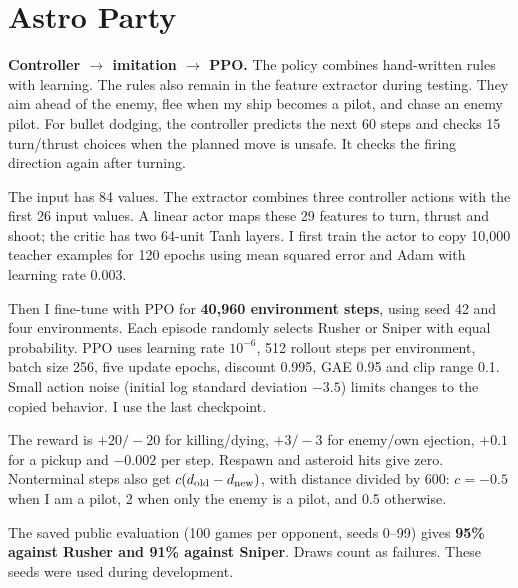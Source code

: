 \documentclass[a4paper]{article}
\begin{document}
\section{Astro Party}
\begin{answer}
\textbf{Controller $\rightarrow$ imitation $\rightarrow$ PPO.}
The policy combines hand-written rules with learning. The rules also remain in the feature extractor during testing.
They aim ahead of the enemy, flee when my ship becomes a pilot, and chase an enemy pilot.
For bullet dodging, the controller predicts the next 60 steps and checks 15 turn/thrust choices when the planned move is unsafe. It checks the firing direction again after turning.

The input has 84 values. The extractor combines three controller actions with the first 26 input values.
A linear actor maps these 29 features to turn, thrust and shoot; the critic has two 64-unit Tanh layers.
I first train the actor to copy 10,000 teacher examples for 120 epochs using mean squared error and Adam with learning rate 0.003.

Then I fine-tune with PPO for \textbf{40,960 environment steps}, using seed 42 and four environments. Each episode randomly selects Rusher or Sniper with equal probability.
PPO uses learning rate $10^{-6}$, 512 rollout steps per environment, batch size 256, five update epochs, discount 0.995, GAE 0.95 and clip range 0.1.
Small action noise (initial log standard deviation $-3.5$) limits changes to the copied behavior. I use the last checkpoint.

The reward is $+20/-20$ for killing/dying, $+3/-3$ for enemy/own ejection, $+0.1$ for a pickup and $-0.002$ per step. Respawn and asteroid hits give zero.
Nonterminal steps also get $c(d_{\rm old}-d_{\rm new})$, with distance divided by 600: $c=-0.5$ when I am a pilot, 2 when only the enemy is a pilot, and 0.5 otherwise.

The saved public evaluation (100 games per opponent, seeds 0--99) gives \textbf{95\% against Rusher and 91\% against Sniper}. Draws count as failures. These seeds were used during development.
\end{answer}
\newpage
\end{document}
